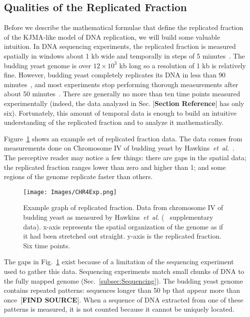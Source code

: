 	
		\subsection{Qualities of the Replicated Fraction}
		\label{subsec:QualitiesReplicatedFraction}
		
		Before we describe the mathematical formulae that define the replicated fraction of the KJMA-like model of DNA replication, we will build some valuable intuition.
		In DNA sequencing experiments, the replicated fraction is measured spatially in windows about 1 kb wide and temporally in steps of 5 minutes~\cite{StochasticTermination}.
		The budding yeast genome is over $12\times10^3$ kb long so a resolution of 1 kb is relatively fine.
		However, budding yeast completely replicates its DNA in less than 90 minutes~\cite{DeepSeq}, and most experiments stop performing thorough measurements after about 50 minutes~\cite{StochasticTermination,DeepSeq,McCuneMicroArray}.
		There are generally no more than ten time points measured experimentally (indeed, the data analyzed in Sec. [\textbf{Section Reference}] has only six).
		Fortunately, this amount of temporal data is enough to build an intuitive understanding of the replicated fraction and to analyze it mathematically.
		
		Figure~\ref{fig:ReplicatedFractionExample} shows an example set of replicated fraction data.
		The data comes from measurements done on Chromosome IV of budding yeast by Hawkins~\emph{et~al.}~\cite{StochasticTermination}.
		The perceptive reader may notice a few things:
		there are gaps in the spatial data;
		the replicated fraction ranges lower than zero and higher than 1;
		and some regions of the genome replicate faster than others.
		
		\begin{figure}[tbh]
			\begin{center}
				\texttt{[image: Images/CHR4Exp.png]}
			\end{center}
				\caption[Budding yeast Chromosome IV replicated fraction]{\label{fig:ReplicatedFractionExample} Example graph of replicated fraction.
					Data from chromosome IV of budding yeast as measured by Hawkins~\emph{et~al.} (~\cite{StochasticTermination} supplementary data).
					x-axis represents the spatial organization of the genome as if it had been stretched out straight.
					y-axis is the replicated fraction.
					Six time points.
				}
		\end{figure}
		
		The gaps in Fig.~\ref{fig:ReplicatedFractionExample} exist because of a limitation of the sequencing experiment used to gather this data.
		Sequencing experiments match small chunks of DNA to the fully mapped genome (Sec.~\ref{subsec:Sequencing}).
		The budding yeast genome contains repeated patterns: sequences longer than 50 bp that appear more than once~[\textbf{FIND SOURCE}].
		When a sequence of DNA extracted from one of these patterns is measured, it is not counted because it cannot be uniquely located.
		
